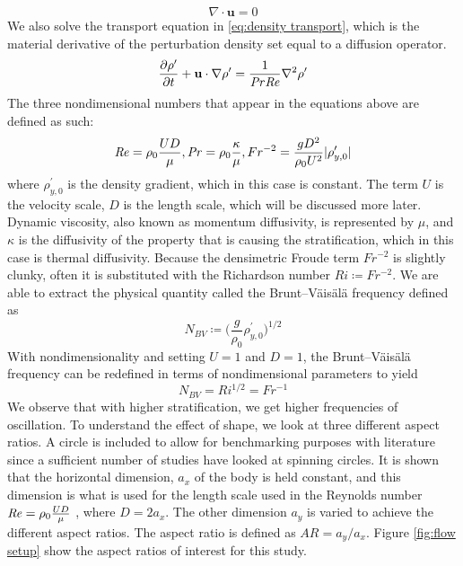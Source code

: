 \begin{equation}
    \label{eq:cont}
    \nabla \cdot \textbf{u} = 0
\end{equation}
We also solve the transport equation in \ref{eq:density transport}, which is the material derivative of the perturbation density set equal to a diffusion operator.  
\begin{equation}
    \label{eq:density transport}
    \frac{\partial\rho '}{\partial t}+\mathbf{u}\cdot\nabla\rho'=\frac{1}{\mathit{Pr} \mathit{Re}}\nabla^2\rho '
\end{equation}
The three nondimensional numbers that appear in the equations above are defined as such:
\begin{equation}
    \mathit{Re} = \rho_0 \frac{U D}{\mu}, \mathit{Pr} = \rho_0 \frac{\kappa}{\mu}, Fr^{-2}=\frac{gD^2}{\rho_0 U^2}|\rho^{\prime}_{y,0}|
\end{equation}
where $\rho^{\prime}_{y,0}$ is the density gradient, which in this case is constant. The term $U$ is the velocity scale, $D$ is the length scale, which will be discussed more later. Dynamic viscosity, also known as momentum diffusivity, is represented by $\mu$, and $\kappa$ is the diffusivity of the property that is causing the stratification, which in this case is thermal diffusivity. Because the densimetric Froude term $Fr^{-2}$ is slightly clunky, often it is substituted with the Richardson number $Ri \coloneqq Fr^{-2}$. We are able to extract the physical quantity called the Brunt–Väisälä frequency defined as
\begin{equation}
    \label{eq:NBV}
    N_{BV} \coloneqq \bigg( \frac{g}{\rho_0} \rho^{\prime}_{y,0} \bigg)^{1/2}    
\end{equation}
With nondimensionality and setting $U = 1$ and $D = 1$, the Brunt–Väisälä frequency can be redefined in terms of nondimensional parameters to yield
\begin{equation}
    \label{eq:nondim NBV}
    N_{BV} = Ri^{1/2} = Fr^{-1}
\end{equation}
We observe that with higher stratification, we get higher frequencies of oscillation. 
To understand the effect of shape, we look at three different aspect ratios. A circle is included to allow for benchmarking purposes with literature since a sufficient number of studies have looked at spinning circles. It is shown that the horizontal dimension, $a_x$ of the body is held constant, and this dimension is what is used for the length scale used in the Reynolds number $\mathit{Re} = \rho_0 \frac{U D}{\mu}$ , where $D = 2a_x$. The other dimension $a_y$ is varied to achieve the different aspect ratios. The aspect ratio is defined as $AR = a_y/a_x$. Figure \ref{fig:flow setup} show the aspect ratios of interest for this study. 
